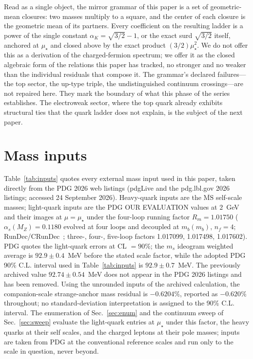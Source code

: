 \documentclass[aps,twocolumn,superscriptaddress,nofootinbib,floatfix]{revtex4-2}
\newcommand{\MSbar}{\overline{\mathrm{MS}}}
\newcommand{\mstar}{\mu_\star}
\newcommand{\alphaK}{\alpha_K}
\begin{document}
Read as a single object, the mirror grammar of this paper is a set of geometric-mean closures: two masses multiply to a square, and the center of each closure is the geometric mean of its partners. Every coefficient on the resulting ladder is a power of the single constant $\alphaK=\sqrt{3/2}-1$, or the exact surd $\sqrt{3/2}$ itself, anchored at $\mstar$ and closed above by the exact product $(3/2)\mstar^2$. We do not offer this as a derivation of the charged-fermion spectrum; we offer it as the closed algebraic form of the relations this paper has tracked, no stronger and no weaker than the individual residuals that compose it. The grammar's declared failures---the top sector, the up-type triple, the undistinguished continuum crossings---are not repaired here. They mark the boundary of what this phase of the series establishes. The electroweak sector, where the top quark already exhibits structural ties that the quark ladder does not explain, is the subject of the next paper.

\section{Mass inputs}
\label{app:inputs}

Table~\ref{tab:inputs} quotes every external mass input used in this paper, taken directly from the PDG 2026 web listings (pdgLive and the pdg.lbl.gov 2026 listings; accessed 24 September 2026). Heavy-quark inputs are the $\MSbar$ self-scale masses; light-quark inputs are the PDG OUR EVALUATION values at $2$~GeV and their images at $\mu=\mstar$ under the four-loop running factor $R_m=1.01750$ ($\alpha_s(M_Z)=0.1180$ evolved at four loops and decoupled at $m_b(m_b)$, $n_f=4$; RunDec/CRunDec~\cite{RunDec3}; three-, four-, five-loop factors 1.017099, 1.017498, 1.017602). PDG quotes the light-quark errors at CL $=90\%$; the $m_s$ ideogram weighted average is $92.9\pm0.4$~MeV before the stated scale factor, while the adopted PDG 90\% C.L. interval used in Table~\ref{tab:inputs} is $92.9\pm0.7$~MeV. The previously archived value $92.74\pm0.54$~MeV does not appear in the PDG 2026 listings and has been removed. Using the unrounded inputs of the archived calculation, the companion-scale strange-anchor mass residual is $-0.6204\%$, reported as $-0.620\%$ throughout; no standard-deviation interpretation is assigned to the 90\% C.L. interval. The enumeration of Sec.~\ref{sec:enum} and the continuum sweep of Sec.~\ref{sec:sweep} evaluate the light-quark entries at $\mstar$ under this factor, the heavy quarks at their self scales, and the charged leptons at their pole masses; inputs are taken from PDG at the conventional reference scales and run only to the scale in question, never beyond.
\end{document}
